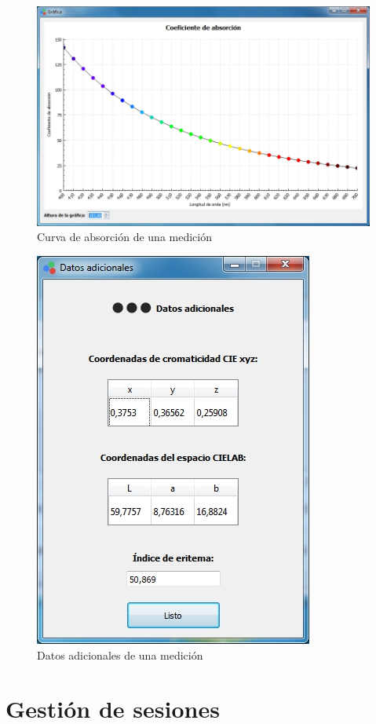 \begin{figure}[H]
  \centering
  \includegraphics[width=1\linewidth]{./img/resultados-absorcion.jpg}
\caption[]{Curva de absorci\'{o}n de una medici\'{o}n\label{fig:resultados-absorcion}}
\end{figure}

\newpage
\null
\vfill
\begin{figure}[H]
  \centering
  \includegraphics[width=.6\linewidth]{./img/resultados-adicionales.jpg}
\caption[]{Datos adicionales de una medici\'{o}n\label{fig:resultados-adicionales}}
\end{figure}
\vfill
\newpage

\section*{Gesti\'{o}n de sesiones}

